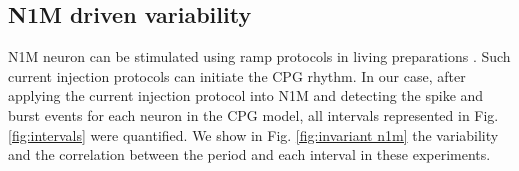 \subsection{N1M driven variability}
\label{subsec:n1m driven}

N1M neuron can be stimulated using ramp protocols in living preparations \parencite{elliott_temporal_1991}. Such current injection protocols can  initiate the CPG rhythm. In our case, after applying the current injection protocol into N1M and detecting the spike and burst events for each neuron in the CPG model, all  intervals represented in Fig. \ref{fig:intervals} were quantified. We show in Fig. \ref{fig:invariant n1m} the variability and the correlation between the period and each interval in these experiments.

\begin{figure}[hbt!]
	\begin{minipage}[b]{0.45\textwidth}
		\centering

\end{minipage}
\end{figure}
